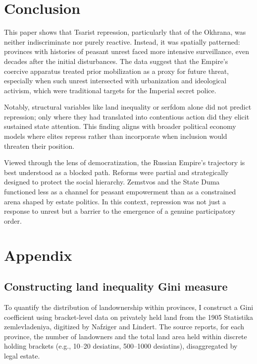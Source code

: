\documentclass[11pt]{scrarticle}
\begin{document}
\section{Conclusion}

This paper shows that Tsarist repression, particularly that of the Okhrana, was neither indiscriminate nor purely reactive. Instead, it was spatially patterned: provinces with histories of peasant unrest faced more intensive surveillance, even decades after the initial disturbances. The data suggest that the Empire’s coercive apparatus treated prior mobilization as a proxy for future threat, especially when such unrest intersected with urbanization and ideological activism, which were traditional targets for the Imperial secret police.

Notably, structural variables like land inequality or serfdom alone did not predict repression; only where they had translated into contentious action did they elicit sustained state attention. This finding aligns with broader political economy models where elites repress rather than incorporate when inclusion would threaten their position.

Viewed through the lens of democratization, the Russian Empire’s trajectory is best understood as a blocked path. Reforms were partial and strategically designed to protect the social hierarchy. Zemstvos and the State Duma functioned less as a channel for peasant empowerment than as a constrained arena shaped by estate politics. In this context, repression was not just a response to unrest but a barrier to the emergence of a genuine participatory order.

\printbibliography

\section{Appendix}

\subsection{Constructing land inequality Gini measure}\label{sub:constructing_land_inequality_gini_measure}

To quantify the distribution of landownership within provinces, I construct a Gini coefficient using bracket-level data on privately held land from the 1905 Statistika zemlevladeniya, digitized by Nafziger and Lindert. The source reports, for each province, the number of landowners and the total land area held within discrete holding brackets (e.g., 10–20 desiatins, 500–1000 desiatins), disaggregated by legal estate.
\end{document}
